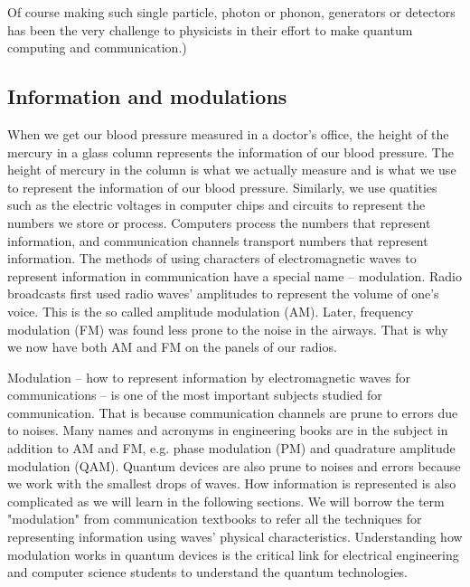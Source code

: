 \documentclass{book}
\begin{document}
Of course making such single particle, photon or phonon, generators or detectors has been the very challenge to physicists in their effort to make quantum computing and communication.)

\subsection{Information and modulations}
When we get our blood pressure measured in a doctor's office, the height of the mercury in a glass column represents 
the information of our blood pressure. The height of mercury in the column is what we actually measure and is 
what we use to represent the information of our blood pressure. Similarly, we use quatities such as the electric 
voltages in computer chips and circuits to represent the numbers we store or process. Computers process the numbers that
represent information, and communication channels transport numbers that represent information. The methods of using characters
of electromagnetic waves to represent information in communication have a special name -- modulation. 
Radio broadcasts first used radio waves' amplitudes to represent the volume of one's voice. This is the so called amplitude modulation (AM). Later, frequency modulation (FM) was found less prone to the noise in the airways. That is why we now have both AM and FM on the panels of our radios.

Modulation -- how to represent information by electromagnetic waves for communications -- is one of the most important subjects studied for communication. That is because communication channels are prune to errors due to noises. Many names and acronyms in engineering books are in the subject in addition to AM and FM, e.g. phase modulation (PM) and quadrature amplitude modulation (QAM). Quantum devices are also prune to noises and errors because we work with the smallest drops of waves. How information is represented is also complicated as we will learn in the following sections. We will borrow the term "modulation" from communication textbooks to refer all the techniques for representing information using waves' physical characteristics. Understanding how modulation works in quantum devices is the critical link for electrical engineering and computer science students to understand the quantum technologies. 
\end{document}

